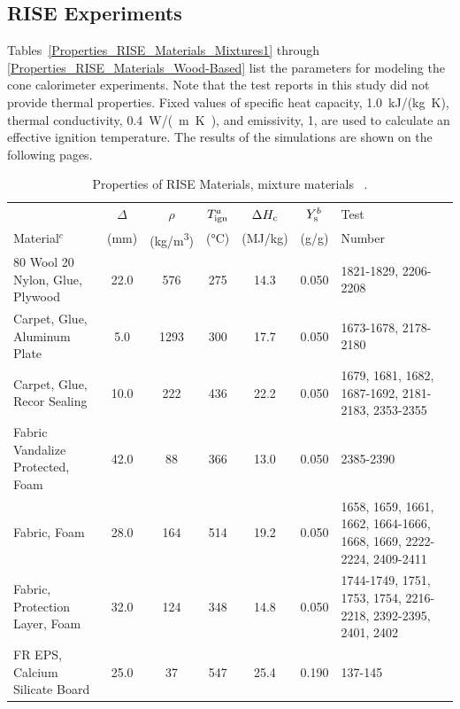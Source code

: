 \clearpage


\subsection{RISE Experiments}\label{sec_RISE_Materials}

Tables~\ref{Properties_RISE_Materials_Mixtures1} through \ref{Properties_RISE_Materials_Wood-Based} list the parameters for modeling the cone calorimeter experiments. Note that the test reports in this study did not provide thermal properties. Fixed values of specific heat capacity, 1.0~kJ/(kg~K), thermal conductivity, 0.4~\unit{W/(m.K)}, and emissivity, 1, are used to calculate an effective ignition temperature. The results of the simulations are shown on the following pages.

\begin{table}[!h]
\caption[Properties of RISE Materials, mixture materials]{Properties of RISE Materials, mixture materials ~\cite{RISE:Fire_Database}.}
\centering
\begin{tabular}{|l|c|c|c|c|c|p{3.7cm}|}
\hline
                & $\Delta$  & $\rho$     & $T_{\rm{ign}}^{a}$ & $\Delta H_{\rm c}$  & $Y_{\rm s}^{b}$ & Test    \\
Material$^{c}$  & (mm)      & (\unit{kg/m^3}) & (\unit{\degreeCelsius})        & (MJ/kg)             & (g/g)           & Number  \\ \hline
\hline
80 Wool 20 Nylon, Glue, Plywood                   & 22.0 & 576  & 275 & 14.3 & 0.050 & 1821-1829, 2206-2208 \\\hline
Carpet, Glue, Aluminum Plate                      & 5.0  & 1293 & 300 & 17.7 & 0.050 & 1673-1678, 2178-2180 \\\hline
Carpet, Glue, Recor Sealing                       & 10.0 & 222  & 436 & 22.2 & 0.050 & 1679, 1681, 1682, 1687-1692, 2181-2183, 2353-2355 \\\hline
Fabric Vandalize Protected, Foam                  & 42.0 & 88   & 366 & 13.0 & 0.050 & 2385-2390 \\\hline
Fabric, Foam                                      & 28.0 & 164  & 514 & 19.2 & 0.050 & 1658, 1659, 1661, 1662, 1664-1666, 1668, 1669, 2222-2224, 2409-2411 \\\hline
Fabric, Protection Layer, Foam                    & 32.0 & 124  & 348 & 14.8 & 0.050 & 1744-1749, 1751, 1753, 1754, 2216-2218, 2392-2395, 2401, 2402 \\\hline
FR EPS, Calcium Silicate Board                    & 25.0 & 37   & 547 & 25.4 & 0.190 & 137-145 \\\hline

\end{tabular}
\end{table}
